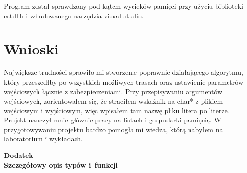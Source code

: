 \documentclass[12pt,a4paper,twoside]{article}
\let\oldmarginpar\marginpar
\renewcommand\marginpar[1]{%
  {\linespread{0.85}\normalfont\scriptsize%
\oldmarginpar[\hspace{1cm}\begin{minipage}{3cm}\raggedleft\scriptsize\color{black}\textsf{#1}\end{minipage}]%
{\hspace{0cm}\begin{minipage}{3cm}\raggedright\scriptsize\color{black}\textsf{#1}\end{minipage}}%
}%
}
\begin{document}
Program został sprawdzony pod kątem wycieków pamięci przy użyciu biblioteki cstdlib i wbudowanego narzędzia visual studio.

%



\section{Wnioski}
\marginpar{}
Największe trudności sprawiło mi stworzenie poprawnie działającego algorytmu, który przeszedłby po wszystkich możliwych trasach oraz ustawienie parametrów wejściowych łącznie z zabezpieczeniami. Przy przepisywaniu argumentów wejściowych, zorientowałem się, że straciłem wskaźnik na char* z plikiem wejściowym i wyjściowym, więc wpisałem tam nazwę pliku litera po literze. Projekt nauczył mnie głównie pracy na listach i gospodarki pamięcią. W przygotowywaniu projektu bardzo pomogła mi wiedza, którą nabyłem na laboratorium i wykładach.  

 
\begin{filecontents}{bibliografia.bib}

}
\end{filecontents}




 
\cleardoublepage

\rule{0cm}{0cm}

\vfill

\begin{center}
\Huge\bfseries Dodatek\\Szczegółowy opis typów i~funkcji\par
\end{center}

\vfill 

\rule{0cm}{0cm}
\end{document}
